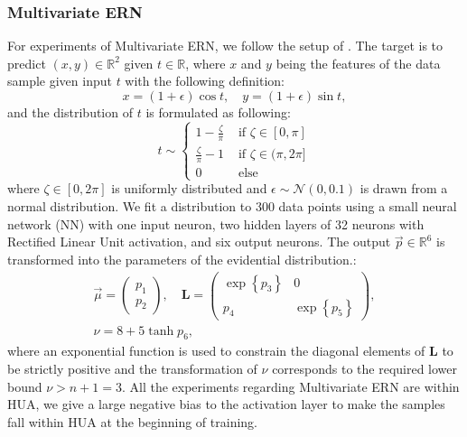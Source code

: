 \subsubsection{Multivariate ERN}
For experiments of Multivariate ERN, we follow the setup of \citeauthor{meinert2021multivariate}. The target is to predict $(x, y) \in \mathbb{R}^2$ given $t \in \mathbb{R}$, where $x$ and $y$ being the features of the data sample given input $t$ with the following definition:
\begin{equation}
x=(1+\epsilon) \cos t, \quad 
y=(1+\epsilon) \sin t,
\end{equation}
and the distribution of $t$ is formulated as following:
\begin{equation}
t \sim \begin{cases}1-\frac{\zeta}{\pi} & \text { if } \zeta \in[0, \pi] \\ \frac{\zeta}{\pi}-1 & \text { if } \zeta \in(\pi, 2 \pi] \\ 0 & \text { else }\end{cases}
\end{equation}
where $\zeta \in[0,2 \pi]$ is uniformly distributed and $\epsilon \sim \mathcal{N}(0,0.1)$ is drawn from a normal distribution. We fit a distribution to 300 data points using a small neural network (NN) with one input neuron, two hidden layers of 32 neurons with Rectified Linear Unit activation, and six output neurons. The output $\vec{p} \in \mathbb{R}^6$ is transformed into the parameters of the evidential distribution.:
\begin{equation}
\begin{gathered}
\vec{\mu}=\left(\begin{array}{c}
p_1 \\
p_2
\end{array}\right), \quad \boldsymbol{L}=\left(\begin{array}{cc}
\exp \left\{p_3\right\} & 0 \\
p_4 & \exp \left\{p_5\right\}
\end{array}\right), \\
\nu=8+5 \tanh p_6,
\end{gathered}
\end{equation}
where an exponential function is used to constrain the diagonal elements of $\boldsymbol{L}$ to be strictly positive and the transformation of $\nu$ corresponds to the required lower bound $ \nu>n+1=3$.
All the experiments regarding Multivariate ERN are within HUA, we give a large negative bias to the activation layer to make the samples fall within HUA at the beginning of training.


